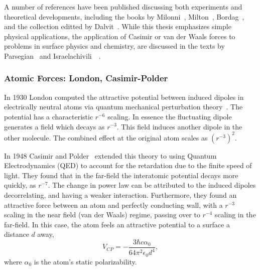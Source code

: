 A number of references have been published discussing both experiments and theoretical developments,
including the books by Milonni~\cite{Milonni1994}, Milton~\cite{Milton2001}, Bordag~\etal\cite{Bordag2009}, 
and the collection editted by Dalvit~\etal\cite{Dalvit2011}.  
While this thesis emphasizes simple physical applications, the application of Casimir or 
van der Waals forces to problems in surface physics and chemistry, are discussed in the texts by 
 Parsegian~\cite{Parsegian2006} and Israelachivili~\etal~\cite{Israelachvili2011}.


\subsubsection{Atomic Forces: London, Casimir-Polder}

In 1930 London computed the attractive potential between induced dipoles in electrically neutral
atoms via quantum mechanical perturbation theory~\cite{London1930}.  The potential has a characteristic $r^{-6}$ scaling.
In essence the fluctuating dipole generates a field which decays as $r^{-3}$.  This field induces another
dipole in the other molecule.  The combined effect at the original atom scales as $(r^{-3})^2$.  

In 1948 Casimir and Polder~\cite{CasimirPolder1948} extended this theory to using Quantum Electrodynamics
(QED) to account for the retardation due to the finite speed of light.  They found that in the 
far-field the interatomic potential decays more quickly, as $r^{-7}$.  The change in power law can be 
attributed to the induced dipoles decorrelating, and having a weaker interaction.  Furthermore,
they found an attractive force between an atom and perfectly conducting wall, with a $r^{-3}$ scaling
in the near field (van der Waals) regime, passing over to $r^{-4}$ scaling in the far-field.    
In this case, the atom feels an attractive potential to a surface a distance $d$ away,
\begin{equation}
  V_{CP} =-\frac{3\hbar c\alpha_0}{64\pi^2\epsilon_0 d^4},
\end{equation}
where $\alpha_0$ is the atom's static polarizability.  

